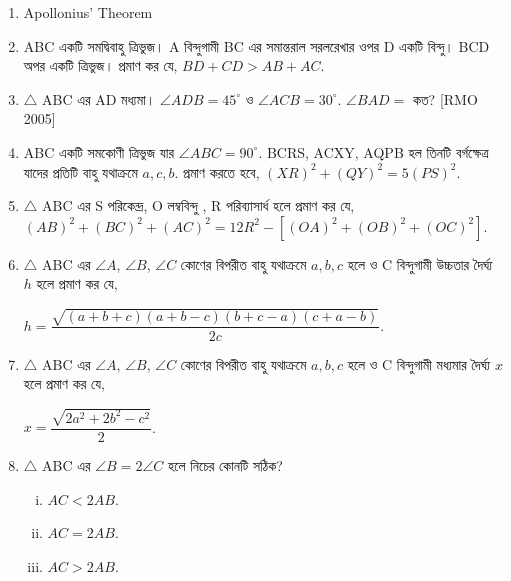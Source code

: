 \documentclass[11pt, a4paper]{article}
\begin{document}
\begin{enumerate}
	\item Apollonius' Theorem
	

	\item ABC \textbengali{একটি সমদ্বিবাহু ত্রিভুজ।} A \textbengali{বিন্দুগামী} BC \textbengali{এর সমান্তরাল সরলরেখার ওপর} D \textbengali{একটি বিন্দু।} BCD \textbengali{অপর একটি ত্রিভুজ। প্রমাণ কর যে,} $ BD + CD > AB + AC $.
	
	\item $ \bigtriangleup $ ABC \textbengali{এর} AD \textbengali{মধ্যমা।} $ \angle ADB = 45^{\circ} $ \textbengali{ও}  $ \angle ACB = 30^{\circ} $. $ \angle BAD = $ \textbengali{কত?} [RMO 2005]
	
	\item ABC \textbengali{একটি সমকোণী ত্রিভুজ যার} $ \angle ABC = 90^{\circ} $. BCRS, ACXY, AQPB \textbengali{হল তিনটি বর্গক্ষেত্র যাদের প্রতিটি বাহু যথাক্রমে} $ a,c,b $. \textbengali{প্রমাণ করতে হবে,} $ (XR)^2 + (QY)^2 = 5(PS)^2 $.
	
	\item $ \bigtriangleup $ ABC \textbengali{এর} S \textbengali{পরিকেন্দ্র}, O \textbengali{লম্ববিন্দু} , R \textbengali{পরিব্যাসার্ধ হলে প্রমাণ কর যে,} \\ $ (AB)^2 + (BC)^2 + (AC)^2 = 12R^2 - [ (OA)^2 + (OB)^2 + (OC)^2 ] $.
	
	\newpage
	
	\item $ \bigtriangleup $ ABC \textbengali{এর} $ \angle A $, $ \angle B $, $ \angle C $ \textbengali{কোণের বিপরীত বাহু যথাক্রমে} $ a,b,c $ \textbengali{হলে ও } C \textbengali{বিন্দুগামী উচ্চতার দৈর্ঘ্য } $ h $ \textbengali{হলে প্রমাণ কর যে,} \begin{center}
	$ h = \dfrac{\sqrt{(a+b+c)(a+b-c)(b+c-a)(c+a-b)}}{2c} $.
	\end{center}
	
	\item $ \bigtriangleup $ ABC \textbengali{এর} $ \angle A $, $ \angle B $, $ \angle C $ \textbengali{কোণের বিপরীত বাহু যথাক্রমে} $ a,b,c $ \textbengali{হলে ও } C \textbengali{বিন্দুগামী মধ্যমার দৈর্ঘ্য } $ x $ \textbengali{হলে প্রমাণ কর যে,}
\begin{center}
$ x = \dfrac{\sqrt{2a^2 + 2b^2 - c^2}}{2} $.
\end{center}

	\item $ \bigtriangleup $ ABC \textbengali{এর} $ \angle B = 2\angle C $ \textbengali{হলে নিচের কোনটি সঠিক}?
	\begin{enumerate}[(i)]
		\item $ AC <2AB $.
		\item $ AC = 2AB $.
		\item $ AC > 2AB $.
	\end{enumerate}
	

\end{enumerate}
\end{document}
